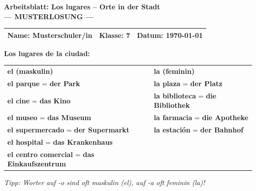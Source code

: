 \documentclass[11pt, a4paper]{article}
\newcommand{\fachfarbe}{spanisch}
\newcommand{\thema}{Los lugares -- Orte in der Stadt}
\newcommand{\klasse}{7}
\newcommand{\datum}{\today}
\newcommand{\loesung}[1]{\textcolor{loesung}{\textbf{#1}}}
\newcommand{\es}[1]{\textcolor{\fachfarbe}{\textbf{#1}}}
\begin{document}
\begin{center}
    {\Large\bfseries\textcolor{\fachfarbe}{Arbeitsblatt: \thema}}\\[0.3em]
    {\large\textcolor{loesung}{\textbf{--- MUSTERLOSUNG ---}}}
\end{center}

\vspace{5pt}

\noindent
\begin{tabularx}{\textwidth}{|X|X|X|}
\hline
\textbf{Name:} \textcolor{loesung}{Musterschuler/in} &
\textbf{Klasse:} \klasse &
\textbf{Datum:} \datum \\
\hline
\end{tabularx}

\vspace{15pt}


\begin{merkkasten}
\textbf{Los lugares de la ciudad:}

\vspace{0.5em}

\begin{tabular}{p{5.5cm}p{5.5cm}}
\textbf{el (maskulin)} & \textbf{la (feminin)} \\[0.3em]
\es{el parque} = \loesung{der Park} & \es{la plaza} = \loesung{der Platz} \\[0.8em]
\es{el cine} = \loesung{das Kino} & \es{la biblioteca} = \loesung{die Bibliothek} \\[0.8em]
\es{el museo} = \loesung{das Museum} & \es{la farmacia} = \loesung{die Apotheke} \\[0.8em]
\es{el supermercado} = \loesung{der Supermarkt} & \es{la estación} = \loesung{der Bahnhof} \\[0.8em]
\es{el hospital} = \loesung{das Krankenhaus} & \\[0.8em]
\es{el centro comercial} = \loesung{das Einkaufszentrum} & \\
\end{tabular}

\vspace{0.5em}

\textit{Tipp: Worter auf -o sind oft maskulin (el), auf -a oft feminin (la)!}
\end{merkkasten}
\end{document}
